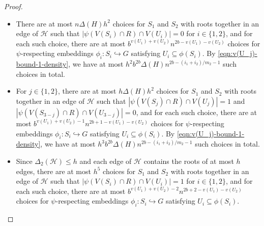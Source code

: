 \documentclass[11pt]{article}
\def\COMMENT#1{}
\numberwithin{equation}{section}
\newcounter{i}
\theoremstyle{plain}
\theoremstyle{plain} %
\theoremstyle{definition}
\newcommand{\cH}{\mathcal{H}}
\begin{document}
\begin{proof}
\begin{itemize}
    \item There are at most $n\Delta(H)h^2$ choices for $S_1$ and $S_2$ with roots together in an edge of $\cH$ such that $|\psi(V(S_i) \cap R) \cap V(U_i)| = 0$ for $i \in \{1,2\}$, and for each such choice, there are at most $b^{v(U_1) + v(U_2)}n^{2b - v(U_1) - v(U_2)}$ choices for $\psi$-respecting embeddings $\phi_i : S_i \hookrightarrow G$ satisfying $U_i \subseteq \phi(S_i)$.  By \eqref{eqn:v(U_j)-bound-1-density}, we have at most %
    $h^2b^{2b}\Delta(H)n^{2b - (i_1 + i_2)/m_2 - 1}$ such choices in total.
    \item For $j \in \{1,2\}$, there are at most $h\Delta(H)h^2$ choices for $S_1$ and $S_2$ with roots together in an edge of $\cH$ such that $|\psi(V(S_j) \cap R) \cap V(U_j)| = 1$ and $|\psi(V(S_{3-j}) \cap R) \cap V(U_{3-j})| = 0$, and for each such choice, there are at most $b^{v(U_1) + v(U_2) - 1}n^{2b + 1 - v(U_1) - v(U_2)}$ choices for $\psi$-respecting embeddings $\phi_i : S_i \hookrightarrow G$ satisfying $U_i \subseteq \phi(S_i)$. By \eqref{eqn:v(U_j)-bound-1-density}, we have at most %
    $h^3b^{2b}\Delta(H)n^{2b - (i_1 + i_2)/m_2 - 1}$ such choices in total.
    \item Since $\Delta_2(\cH) \leq h$ and each edge of $\cH$ contains the roots of at most $h$ edges, there are at most $h^5$ choices for $S_1$ and $S_2$ with roots together in an edge of $\cH$ 
    such that $|\psi(V(S_i) \cap R) \cap V(U_i)| = 1$ for $i \in \{1,2\}$, and for each such choice, there are at most $b^{v(U_1) + v(U_2) - 2}n^{2b + 2 - v(U_1) - v(U_2)}$ choices for $\psi$-respecting embeddings $\phi_i : S_i \hookrightarrow G$ satisfying $U_i \subseteq \phi(S_i)$. %

\end{itemize}
\end{proof}
\end{document}
